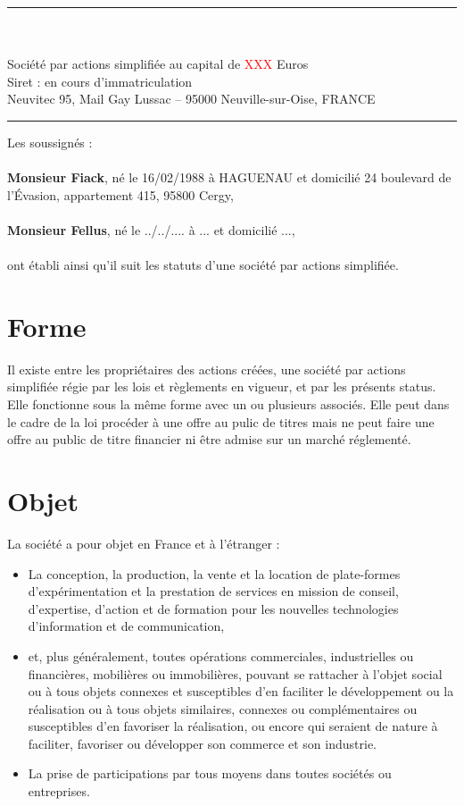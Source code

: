 \documentclass[a4paper,12pt]{report}
\newcommand{\address}{Neuvitec 95, Mail Gay Lussac -- 95000 Neuville-sur-Oise, FRANCE}
\begin{document}


\begin{center}
	\begin{minipage}{0.8\linewidth}
		\center
		\rule{\linewidth}{0.5mm}\\
		\large{}\\
		\normalsize
		Société par actions simplifiée au capital de \textcolor{red}{XXX} Euros\\
		Siret : en cours d'immatriculation\\
		\normalsize{\address}\\
		\rule{\linewidth}{0.5mm}
	\end{minipage}
\end{center}
\vspace{5mm}
\noindent Les soussignés :\\\\
\textbf{Monsieur Fiack}, né le 16/02/1988 à HAGUENAU et domicilié 24 boulevard de l'Évasion, appartement 415, 95800 Cergy,\\\\
\textbf{Monsieur Fellus}, né le ../../.... à ... et domicilié ...,\\\\
ont établi ainsi qu'il suit les statuts d'une société par actions simplifiée.

\section{Forme}
Il existe entre les propriétaires des actions créées, une société par actions simplifiée régie par les lois et règlements en vigueur, et par les présents status.
Elle fonctionne sous la même forme avec un ou plusieurs associés.
Elle peut dans le cadre de la loi procéder à une offre au pulic de titres mais ne peut faire une offre au public de titre financier ni être admise sur un marché réglementé.

\section{Objet}
La société a pour objet en France et à l'étranger :
\begin{itemize}
	\item La conception, la production, la vente et la location de plate-formes d'expérimentation et la prestation de services en mission de conseil, d'expertise, d'action et de formation pour les nouvelles technologies d'information et de communication,
	\item et, plus généralement, toutes opérations commerciales, industrielles ou financières, mobilières ou immobilières,
		pouvant se rattacher à l'objet social ou à tous objets connexes et susceptibles d'en faciliter le développement ou la réalisation ou à tous objets similaires, 
		connexes ou complémentaires ou susceptibles d'en favoriser la réalisation, ou encore qui seraient de nature à faciliter, favoriser ou développer son commerce et son industrie.
	\item La prise de participations par tous moyens dans toutes sociétés ou entreprises.
\end{itemize}
\end{document}
